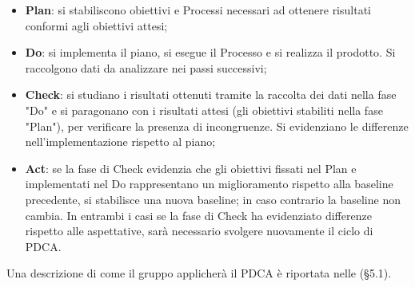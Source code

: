 \begin{itemize}
\item \textbf{Plan}: si stabiliscono obiettivi e Processi necessari ad ottenere risultati conformi agli obiettivi attesi;
\item \textbf{Do}: si implementa il piano, si esegue il Processo e si realizza il prodotto. Si raccolgono dati da analizzare nei passi successivi;
\item \textbf{Check}: si studiano i risultati ottenuti tramite la raccolta dei dati nella fase "Do" e si paragonano con i risultati attesi (gli obiettivi stabiliti nella fase "Plan"), per verificare la presenza di incongruenze. Si evidenziano le differenze nell'implementazione rispetto al piano;
\item \textbf{Act}: se la fase di Check evidenzia che gli obiettivi fissati nel Plan e implementati nel Do rappresentano un miglioramento rispetto alla baseline precedente, si stabilisce una nuova baseline; in caso contrario la baseline non cambia. In entrambi i casi se la fase di Check ha evidenziato differenze rispetto alle aspettative, sarà necessario svolgere nuovamente il ciclo di PDCA.
\end{itemize}
Una descrizione di come il gruppo applicherà il PDCA è riportata nelle \NormeDiProgetto (\S5.1).